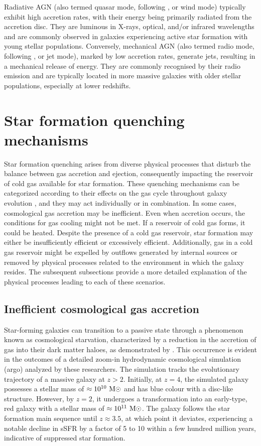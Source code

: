 \documentclass[baaa]{baaa}
\begin{document}
Radiative AGN (also termed quasar mode, following \citealt{Croton_2006}, or wind mode) typically exhibit high accretion rates, with their energy being primarily radiated from the accretion disc. They are luminous in X-rays, optical, and/or infrared wavelengths and are commonly observed in galaxies experiencing active star formation with young stellar populations.
Conversely, mechanical AGN (also termed radio mode, following \citealt{Croton_2006}, or jet mode), marked by low accretion rates, generate jets, resulting in a mechanical release of energy. They are commonly recognised by their radio emission and are typically located in more massive galaxies with older stellar populations, especially at lower redshifts.

\section{Star formation quenching mechanisms}
\label{Sec:SFquenchingMech}

Star formation quenching arises from diverse physical processes that disturb the balance between gas accretion and ejection, consequently impacting the reservoir of cold gas available for star formation. These quenching mechanisms can be categorized according to their effects on the gas cycle throughout galaxy evolution \citep{ManBelli_2018}, and they may act individually or in combination. In some cases, cosmological gas accretion may be inefficient. Even when accretion occurs, the conditions for gas cooling might not be met. If a reservoir of cold gas forms, it could be heated. Despite the presence of a cold gas reservoir, star formation may either be insufficiently efficient or excessively efficient.
Additionally, gas in a cold gas reservoir might be expelled by outflows generated by internal sources or removed by physical processes related to the environment in which the galaxy resides. The subsequent subsections provide a more detailed explanation of the physical processes leading to each of these scenarios.


\subsection{Inefficient cosmological gas accretion}

Star-forming galaxies can transition to a passive state through a phenomenon known as cosmological starvation, characterized by a reduction in the accretion of gas into their dark matter haloes, as demonstrated by \cite{Feldmann_2015}. This occurrence is evident in the outcomes of a detailed zoom-in hydrodynamic cosmological simulation ({\sc argo}) analyzed by these researchers. The simulation tracks the evolutionary trajectory of a massive galaxy at $z > 2$. Initially, at $z=4$, the simulated galaxy possesses a stellar mass of $\approx 10^{10}~{\rm M}{\odot}$ and has blue colour with a disc-like structure. However, by $z=2$, it undergoes a transformation into an early-type, red galaxy with a stellar mass of $\approx 10^{11}~{\rm M}{\odot}$. The galaxy follows the star formation main sequence until $z\approx 3.5$, at which point it deviates, experiencing a notable decline in sSFR by a factor of 5 to 10 within a few hundred million years, indicative of suppressed star formation.
\end{document}
